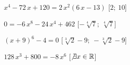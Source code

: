 \begin{esercizio}
\begin{enumeratea}
\item \({x}^{4}-72\,x+120=2\,{x}^{2} \left( 6\,x-13 \right) \) 
\hfill [\(2;~10\)]
\item \(0=-6\,{x}^{8}-24\,{x}^{4}+462\) 
\hfill [\(-\sqrt [4]{7};~\sqrt [4]{7}\)]
\item \( \left( x+9 \right) ^{6}-4=0\) 
\hfill [\(\sqrt [3]{2}-9;~-\sqrt [3]{2}-9\)]
\item \(128\,{x}^{3}+800=-8\,{x}^{6}\) 
\hfill [\(\not\exists x \in \mathbb{R}\)]
\end{enumeratea}
\end{esercizio}

